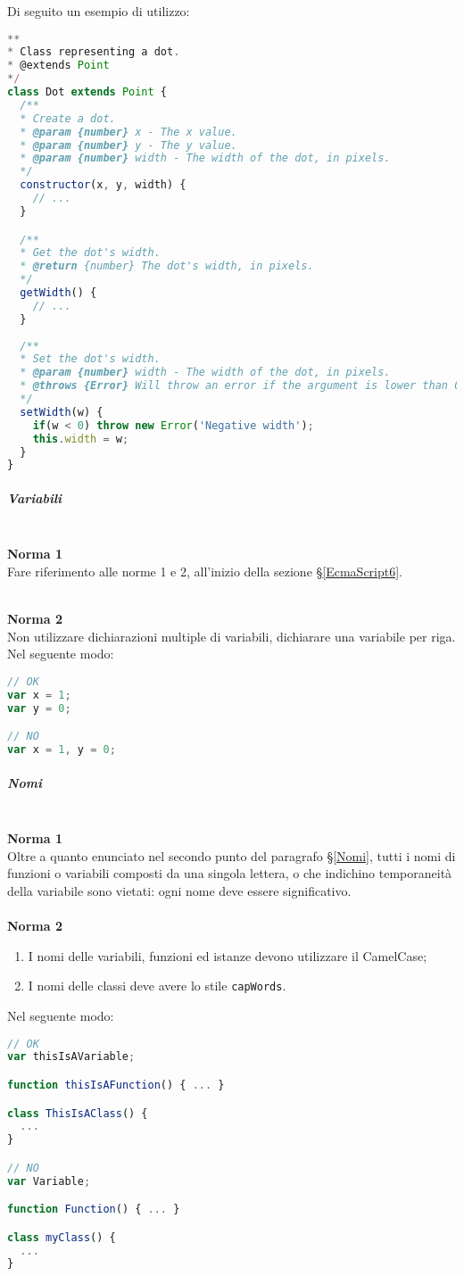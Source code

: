 Di seguito un esempio di utilizzo:
\begin{lstlisting}[language=JavaScript]
**
* Class representing a dot.
* @extends Point
*/
class Dot extends Point {
  /**
  * Create a dot.
  * @param {number} x - The x value.
  * @param {number} y - The y value.
  * @param {number} width - The width of the dot, in pixels.
  */
  constructor(x, y, width) {
    // ...
  }

  /**
  * Get the dot's width.
  * @return {number} The dot's width, in pixels.
  */
  getWidth() {
    // ...
  }
  
  /**
  * Set the dot's width.
  * @param {number} width - The width of the dot, in pixels.
  * @throws {Error} Will throw an error if the argument is lower than 0.
  */
  setWidth(w) {
    if(w < 0) throw new Error('Negative width');
    this.width = w;
  }
}
\end{lstlisting}

\subparagraph{Variabili}\-\\
\textbf{Norma 1}\\
Fare riferimento alle norme 1 e 2, all'inizio della sezione §\ref{EcmaScript6}.

\-\\
\textbf{Norma 2}\\
Non utilizzare dichiarazioni multiple di variabili, dichiarare una variabile per riga.\\
Nel seguente modo:
\begin{lstlisting}[language=JavaScript]
// OK
var x = 1;
var y = 0;

// NO
var x = 1, y = 0;
\end{lstlisting}


\subparagraph{Nomi}\-\\
\textbf{Norma 1}\\
 Oltre a quanto enunciato nel secondo punto del paragrafo §\ref{Nomi}, tutti i nomi di funzioni o variabili composti da una singola lettera, o che indichino temporaneità della variabile sono vietati: ogni nome deve essere significativo.\\
\-\\
\textbf{Norma 2} 
\begin{enumerate}
	\item I nomi delle variabili, funzioni ed istanze devono utilizzare il CamelCase;
	\item I nomi delle classi deve avere lo stile \texttt{capWords}.
\end{enumerate}
Nel seguente modo:
\begin{lstlisting}[language=JavaScript]
// OK
var thisIsAVariable;

function thisIsAFunction() { ... }

class ThisIsAClass() {
  ...
}

// NO
var Variable;

function Function() { ... }

class myClass() {
  ...
}
\end{lstlisting}

